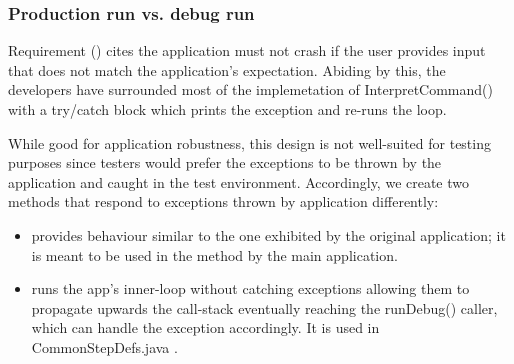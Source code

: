 \subsubsection{Production run vs. debug run}
\label{sec:production-vs-debug}
Requirement (\RSeven) cites the application must not crash if the user provides input that does not match the application's expectation. Abiding by this, the developers have surrounded most of the implemetation of InterpretCommand() with a try/catch block which prints the exception and re-runs the loop. 
\par 
While good for application robustness, this design is not well-suited for testing purposes since testers would prefer the exceptions to be thrown by the application and caught in the test environment. Accordingly, we create two  methods that respond to exceptions thrown by application differently: 

\begin{itemize}
	\item {} provides behaviour similar to the one exhibited by the original application; it is meant to be used in the  method by the main application. 
	\item {} runs the app's inner-loop without catching exceptions allowing them to propagate upwards the call-stack eventually reaching the runDebug() caller, which can handle the exception accordingly. It is used in CommonStepDefs.java . 
\end{itemize}

